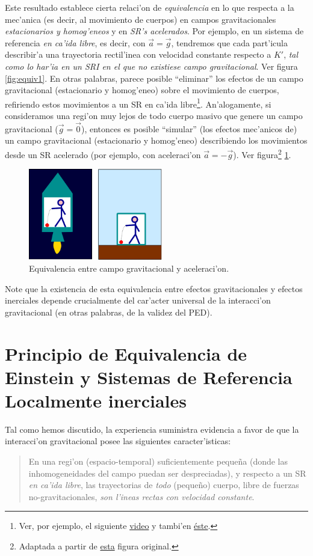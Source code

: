 Este resultado establece cierta relaci'on de \textit{equivalencia} en lo que respecta a la mec'anica (es decir, al movimiento de cuerpos) en campos gravitacionales \textit{estacionarios y homog'eneos} y en \textit{SR's acelerados}. Por ejemplo, en un sistema de referencia \textit{en ca'ida libre}, es decir, con $\vec{a}=\vec{g}$, tendremos que cada part'icula describir'a una trayectoria rectil'inea con velocidad constante respecto a $K'$, \textit{tal como lo har'ia en un SRI en el que no existiese campo gravitacional}. Ver figura \ref{fig:equiv1}.
En otras palabras, parece posible ``eliminar'' los efectos de un campo gravitacional (estacionario y homog'eneo) sobre el movimiento de cuerpos, refiriendo estos movimientos a un SR en ca'ida libre\footnote{Ver, por ejemplo, el siguiente \href{http://youtu.be/1ieR8hIXUIg}{video} y tambi'en \href{http://youtu.be/xsNFqMtNZvI}{\'este}.}.
An'alogamente, si consideramos una regi'on muy lejos de todo cuerpo masivo que genere un campo gravitacional ($\vec{g}=\vec{0}$), entonces es posible ``simular'' (los efectos mec'anicos de) un campo gravitacional (estacionario y homog'eneo) describiendo los movimientos desde un SR acelerado (por ejemplo, con aceleraci'on $\vec{a}=-\vec{g}$). Ver figura\footnote{Adaptada a partir de  \href{http://commons.wikimedia.org/wiki/File:Elevator_gravity.svg}{esta} figura original.} \ref{fig:gya}.
\begin{figure}[H]
 \begin{center}
\includegraphics[height=4cm]{fig/fig-gravedad-y-aceleracion.pdf}
\caption{Equivalencia entre campo gravitacional y aceleraci'on.}
\label{fig:gya}
\end{center}
\end{figure}
Note que la existencia de esta equivalencia entre efectos gravitacionales y efectos inerciales depende crucialmente del car'acter universal de la interacci'on gravitacional (en otras palabras, de la validez del PED).

\section{Principio de Equivalencia de Einstein y Sistemas de Referencia Localmente inerciales}
Tal como hemos discutido, la experiencia suministra evidencia a favor de que la interacci'on gravitacional posee las siguientes caracter'isticas:
\begin{quotation}
En una regi'on (espacio-temporal) suficientemente peque\~na (donde las inhomogeneidades del campo puedan ser despreciadas), y respecto a un SR \textit{en ca'ida libre}, las trayectorias de \textit{todo} (peque\~no) cuerpo, libre de fuerzas no-gravitacionales, \textit{son l'ineas rectas con velocidad constante}.
\end{quotation}

